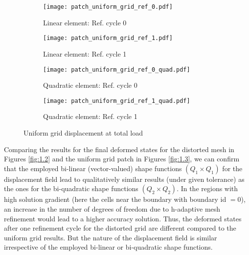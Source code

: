 \begin{figure}[h!]
\centering
\begin{subfigure}[b]{0.35\textwidth}
\centering
\texttt{[image: patch\_uniform\_grid\_ref\_0.pdf]}
\caption{Linear element: Ref. cycle 0}
\label{fig:1.3.1}
\end{subfigure}
\begin{subfigure}[b]{0.35\textwidth}
\centering
\texttt{[image: patch\_uniform\_grid\_ref\_1.pdf]}
\caption{Linear element: Ref. cycle 1}
\label{fig:1.3.2}
\end{subfigure}
\begin{subfigure}[b]{0.35\textwidth}
\centering
\texttt{[image: patch\_uniform\_grid\_ref\_0\_quad.pdf]}
\caption{Quadratic element: Ref. cycle 0}
\label{fig:1.3.3}
\end{subfigure}
\begin{subfigure}[b]{0.35\textwidth}
\centering
\texttt{[image: patch\_uniform\_grid\_ref\_1\_quad.pdf]}
\caption{Quadratic element: Ref. cycle 1}
\label{fig:1.3.4}
\end{subfigure}
\caption{Uniform grid displacement at total load}
\label{fig:1.3}
\end{figure}

Comparing the results for the final deformed states for the distorted mesh in Figures \eqref{fig:1.2} and the uniform grid patch in Figures \eqref{fig:1.3}, we can confirm that the employed bi-linear (vector-valued) shape functions $(Q_1 \times Q_1)$ for the displacement field lead to qualitatively similar results (under given tolerance) as the ones for the bi-quadratic shape functions $(Q_2 \times Q_2)$. In the regions with high solution gradient (here the cells near the boundary with boundary id $= 0$), an increase in the number of degrees of freedom due to h-adaptive mesh refinement would lead to a higher accuracy solution. Thus, the deformed states after one refinement cycle for the distorted grid are different compared to the uniform grid results. But the nature of the displacement field is similar irrespective of the employed bi-linear or bi-quadratic shape functions. \par 

